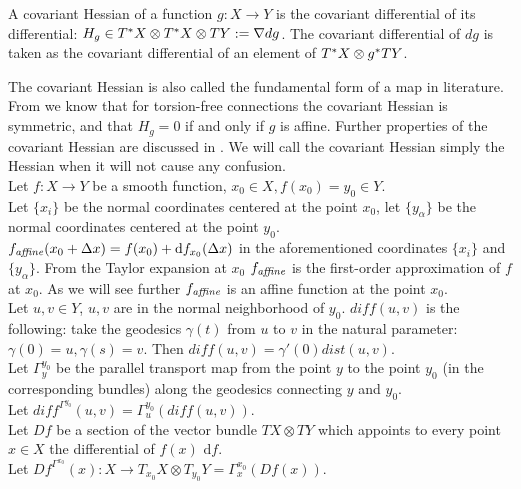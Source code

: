\documentclass[twocolumn]{svjour3}          %
\newcommand{\diff}{\textit{diff}}
\newcommand{\affine}{\mathop{\it affine}}
\newcommand{\delx}{\Delta x}
\newcommand{\CovariantDiff}{\nabla}
\newcommand{\Diff}{\mathrm{d}}
\newcommand{\TangentBundle}[1]{T{#1}}
\newcommand{\CotangentBundle}[1]{\tensor*{T}{^{*}}{#1}}
\newcommand {\Preimage}[2]{{#2}^*{#1}}
\newcommand \TPreimage[2]{\Preimage{\TangentBundle{#1}}{#2}}
\newcommand {\DiffSpace}[3]{\CotangentBundle{#1}\otimes \TPreimage{#2}{#3}}
\newcommand {\HessianSpace}[2]{\CotangentBundle{#1}\otimes \CotangentBundle{#1}\otimes \TangentBundle{#2}}
\begin{document}
\begin{definition} \label{CovariantHessian}
A covariant Hessian of a function $g:X \to Y$ is the covariant differential of its differential: $H_g \in \HessianSpace{X}{Y}:= \CovariantDiff dg$. The covariant differential of $dg$ is taken as the covariant differential of an element of $\DiffSpace{X}{Y}{g}$. 
\end{definition}
The covariant Hessian is also called the fundamental form of a map in literature. From \cite{GeodesicMaps} we know that for torsion-free connections the covariant Hessian is symmetric, and that $H_g = 0$ if and only if $g$ is affine. Further properties of the covariant Hessian are discussed in \cite{GeodesicMaps, RiemannianBlob}. We will call the covariant Hessian simply the Hessian when it will not cause any confusion.
\\
Let $f:X \to Y$ be a smooth function, $x_0 \in X, f(x_0) = y_0 \in Y$.
\\
Let $\{x_i\}$ be the normal coordinates centered at the point $x_0$, let $\{y_{\alpha}\}$ be the normal coordinates centered at the point $y_0$.
\\
$f_{\affine}(x_0 + \delx)=f(x_0) + \Diff f_{x_0}(\delx)$ in the aforementioned coordinates $\{x_i\}$ and $\{y_{\alpha}\}$. From the Taylor expansion at $x_0$ $f_{\affine}$ is the first-order approximation of $f$ at $x_0$. As we will see further $f_{\affine}$ is an affine function at the point $x_0$.
\\
Let $u, v \in Y$, $u, v$ are in the normal neighborhood of $y_0$. $\diff(u,v)$ is the following: take the geodesics $\gamma(t)$ from $u$ to $v$ in the natural parameter: $\gamma(0)=u, \gamma(s)=v$. Then $\diff(u, v)=\gamma'(0) dist(u, v)$.
\\
Let $\Gamma _y^{y_0}$ be the parallel transport map from the point $y$ to the point $y_0$ (in the corresponding bundles) along the geodesics connecting $y$ and $y_0$.
\\
Let $\diff^{\Gamma^{y_0}}(u, v) = \Gamma _u^{y_0}(\diff(u, v))$.
\\
Let $Df$ be a section of the vector bundle $TX \otimes TY$ which appoints to every point $x \in X$ the differential of $f(x)$ $\Diff f$.
\\
Let $Df^{\Gamma^{x_0}}(x):X \to T_{x_0}X \otimes T_{y_0}Y = \Gamma _x^{x_0}(Df(x))$.
\end{document}
